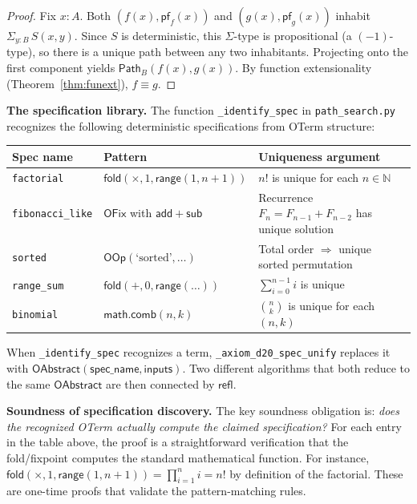 \documentclass[11pt,a4paper]{report}
\theoremstyle{definition}
\theoremstyle{plain}
\newcommand{\Path}{\mathsf{Path}}
\newcommand{\Nat}{\mathbb{N}}
\newcommand{\fold}{\mathsf{fold}}
\begin{document}
\begin{proof}
Fix $x : A$.  Both $(f(x), \mathsf{pf}_f(x))$ and
$(g(x), \mathsf{pf}_g(x))$ inhabit $\Sigma_{y:B}\, S(x,y)$.  Since
$S$ is deterministic, this $\Sigma$-type is propositional (a
$(-1)$-type), so there is a unique path between any two inhabitants.
Projecting onto the first component yields
$\Path_B(f(x), g(x))$.  By function extensionality
(Theorem~\ref{thm:funext}), $f \equiv g$.
\end{proof}

\textbf{The specification library.}
The function \texttt{\_identify\_spec} in \texttt{path\_search.py}
recognizes the following deterministic specifications from OTerm
structure:

\begin{center}
\begin{tabular}{lll}
\toprule
\textbf{Spec name} & \textbf{Pattern} & \textbf{Uniqueness argument} \\
\midrule
\texttt{factorial} & $\fold(\times, 1, \mathsf{range}(1, n{+}1))$
  & $n!$ is unique for each $n \in \Nat$ \\
\texttt{fibonacci\_like} & $\mathsf{OFix}$ with $\mathsf{add}+\mathsf{sub}$
  & Recurrence $F_n = F_{n-1}+F_{n-2}$ has unique solution \\
\texttt{sorted} & $\mathsf{OOp}(\text{`sorted'}, \ldots)$
  & Total order $\Rightarrow$ unique sorted permutation \\
\texttt{range\_sum} & $\fold(+, 0, \mathsf{range}(\ldots))$
  & $\sum_{i=0}^{n-1} i$ is unique \\
\texttt{binomial} & $\mathsf{math.comb}(n, k)$
  & $\binom{n}{k}$ is unique for each $(n,k)$ \\
\bottomrule
\end{tabular}
\end{center}

When \texttt{\_identify\_spec} recognizes a term, \texttt{\_axiom\_d20\_spec\_unify}
replaces it with $\mathsf{OAbstract}(\mathsf{spec\_name}, \mathsf{inputs})$.
Two different algorithms that both reduce to the same
$\mathsf{OAbstract}$ are then connected by $\mathsf{refl}$.

\textbf{Soundness of specification discovery.}
The key soundness obligation is: \emph{does the recognized OTerm
actually compute the claimed specification?}  For each entry in the
table above, the proof is a straightforward verification that the
fold/fixpoint computes the standard mathematical function.  For
instance, $\fold(\times, 1, \mathsf{range}(1, n{+}1)) = \prod_{i=1}^{n} i
= n!$ by definition of the factorial.  These are one-time proofs
that validate the pattern-matching rules.
\end{document}

